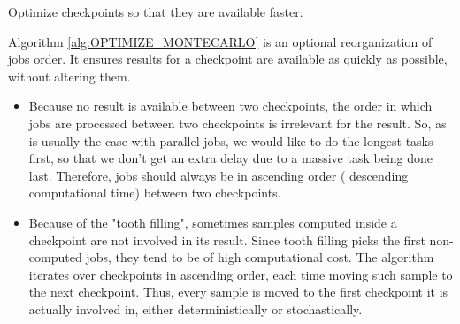\documentclass[./thesis.tex]{subfiles}
\begin{document}
\begin{algorithm}
	\caption{Optimize checkpoints so that they are available faster.}
	\label{alg:OPTIMIZE_MONTECARLO}
	
	
\end{algorithm}

Algorithm \ref{alg:OPTIMIZE_MONTECARLO} is an optional reorganization of jobs order. It ensures results for a checkpoint are available as quickly as possible, without altering them.
\begin{itemize}
\item
Because no result is available between two checkpoints, the order in which jobs are processed between two checkpoints is irrelevant for the result. So, as is usually the case with parallel jobs, we would like to do the longest tasks first, so that we don't get an extra delay due to a massive task being done last. Therefore, jobs should always be in ascending order ( descending computational time) between two checkpoints.
\item
Because of the "tooth filling", sometimes samples computed inside a checkpoint are not involved in its result. Since tooth filling picks the first non-computed jobs, they tend to be of high computational cost. The algorithm iterates over checkpoints in ascending order, each time moving such sample to the next checkpoint. Thus, every sample is moved to the first checkpoint it is actually involved in, either deterministically or stochastically.
\end{itemize}
\end{document}
